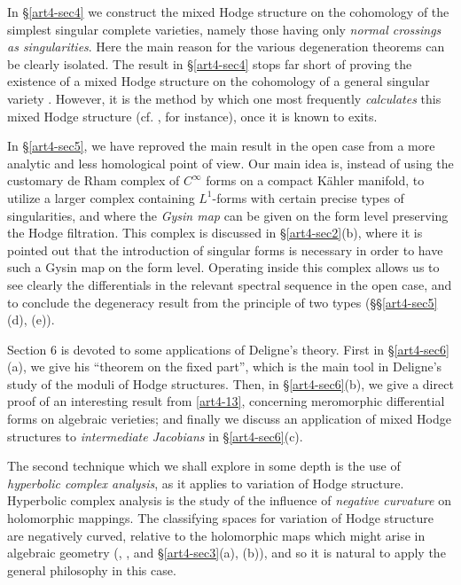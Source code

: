 In \S \ref{art4-sec4} we construct the mixed Hodge structure on the cohomology of the simplest singular complete varieties, namely those having only \textit{normal crossings as singularities}. Here the main reason for the various degeneration theorems can be clearly isolated. The result in \S \ref{art4-sec4} stops far short of proving the existence of a mixed Hodge structure on the cohomology of a general singular variety \cite{art4-key14}. However, it is the method by which one most frequently \textit{calculates} this mixed Hodge structure (cf. \cite{art4-key10}, for instance), once it is known to exits.

In \S \ref{art4-sec5}, we have reproved the main result in the open case \cite{art4-key13} from a more analytic and less homological point of view. Our main idea is, instead of using the customary de Rham complex of $C^\infty$ forms on a compact K\"ahler manifold, to utilize a larger complex containing $L^1$-forms with certain precise types of singularities, and where the \textit{Gysin map} can be given on the form level preserving the Hodge filtration. This complex is discussed in \S\ref{art4-sec2}(b), where it is pointed out that the introduction of singular forms is necessary in order to have such a Gysin map on the form level. Operating inside this complex allows us to see clearly the differentials in the relevant spectral sequence in the open case, and to conclude the degeneracy result from the principle of two types (\S\S\ref{art4-sec5}(d), (e)).

Section 6 is devoted to some applications of Deligne's theory. First in \S \ref{art4-sec6}(a), we give his ``theorem on the fixed part'', which is the main tool in Deligne's study of the moduli of Hodge structures. Then, in \S\ref{art4-sec6}(b), we give a direct proof of an interesting result from \ref{art4-13}, concerning meromorphic differential forms on algebraic verieties; and finally we discuss an application of mixed Hodge structures to \textit{intermediate Jacobians} in \S \ref{art4-sec6}(c).

The second technique which we shall explore in some depth is the use of \textit{hyperbolic complex analysis}, as it applies to variation of Hodge structure. Hyperbolic complex analysis is the study of the influence of \textit{negative curvature} on holomorphic mappings. The classifying spaces for variation of Hodge structure are negatively curved, relative to the holomorphic maps which might arise in algebraic geometry (\cf \cite{art4-key11}, \cite{art4-key25}, and \S \ref{art4-sec3}(a), (b)), and so it is natural to apply the general philosophy in this case.

